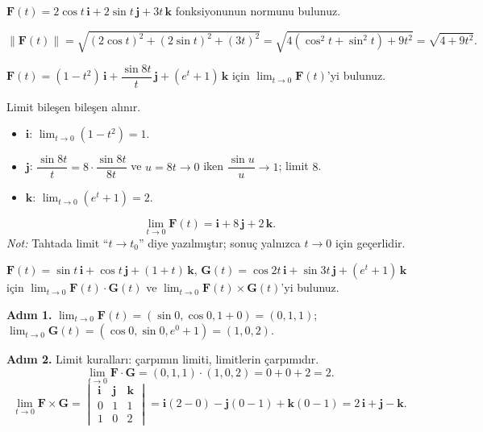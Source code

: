 \begin{soru}
$\mathbf F(t)=2\cos t\,\mathbf i+2\sin t\,\mathbf j+3t\,\mathbf k$ fonksiyonunun normunu bulunuz.
\end{soru}
\begin{cevap}
\[ \|\mathbf F(t)\|=\sqrt{(2\cos t)^2+(2\sin t)^2+(3t)^2}=\sqrt{4(\cos^2t+\sin^2t)+9t^2}=\sqrt{4+9t^2} . \]
\end{cevap}

\begin{soru}
$\mathbf F(t)=(1-t^2)\,\mathbf i+\dfrac{\sin8t}{t}\,\mathbf j+(e^t+1)\,\mathbf k$ için $\displaystyle\lim_{t\to0}\mathbf F(t)$'yi bulunuz.
\end{soru}
\begin{cevap}
Limit bileşen bileşen alınır.
\begin{itemize}
\item $\mathbf i$: $\lim_{t\to0}(1-t^2)=1$.
\item $\mathbf j$: $\dfrac{\sin8t}{t}=8\cdot\dfrac{\sin8t}{8t}$ ve $u=8t\to0$ iken $\dfrac{\sin u}{u}\to1$; limit $8$.
\item $\mathbf k$: $\lim_{t\to0}(e^t+1)=2$.
\end{itemize}
\[ \lim_{t\to0}\mathbf F(t)=\mathbf i+8\,\mathbf j+2\,\mathbf k . \]
\textit{Not:} Tahtada limit ``$t\to t_0$'' diye yazılmıştır; sonuç yalnızca $t\to0$ için geçerlidir.
\end{cevap}

\begin{soru}
$\mathbf F(t)=\sin t\,\mathbf i+\cos t\,\mathbf j+(1+t)\,\mathbf k$, $\mathbf G(t)=\cos2t\,\mathbf i+\sin3t\,\mathbf j+(e^t+1)\,\mathbf k$ için
$\displaystyle\lim_{t\to0}\mathbf F(t)\cdot\mathbf G(t)$ ve $\displaystyle\lim_{t\to0}\mathbf F(t)\times\mathbf G(t)$'yi bulunuz.
\end{soru}
\begin{cevap}
\textbf{Adım 1.} $\lim_{t\to0}\mathbf F(t)=(\sin0,\cos0,1+0)=(0,1,1)$; \ $\lim_{t\to0}\mathbf G(t)=(\cos0,\sin0,e^0+1)=(1,0,2)$.

\textbf{Adım 2.} Limit kuralları: çarpımın limiti, limitlerin çarpımıdır.
\[ \lim_{t\to0}\mathbf F\cdot\mathbf G=(0,1,1)\cdot(1,0,2)=0+0+2=2 . \]
\[ \lim_{t\to0}\mathbf F\times\mathbf G=\begin{vmatrix}\mathbf i&\mathbf j&\mathbf k\\0&1&1\\1&0&2\end{vmatrix}=\mathbf i(2-0)-\mathbf j(0-1)+\mathbf k(0-1)=2\,\mathbf i+\mathbf j-\mathbf k . \]
\end{cevap}

